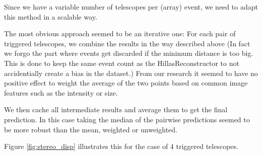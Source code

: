 Since we have a variable number of telescopes per (array) event,
we need to adapt this method in a scalable way.

The most obvious approach seemed to be an iterative one:
For each pair of triggered telescopes, we combine the results 
in the way described above (In fact we forgo the part where events get discarded 
if the minimum distance is too big. This is done to keep the same event count as 
the HillasReconstructor to not accidentially create a bias in the dataset.)
From our research it seemed to have no positive effect to weight
the average of the two points based on common image features such as 
the intensity or size.

We then cache all intermediate results and average them to get the final prediction.
In this case taking the median of the pairwise predictions seemed to be more robust
than the mean, weighted or unweighted.

Figure \ref{fig:stereo_disp} illustrates this for the case of 4 triggered telescopes.


